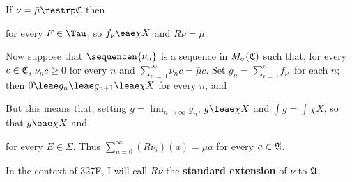 { If $\nu=\bar\mu\restrp\frak C$ then


\noindent for every $F\in\Tau$, so $f_{\nu}\eae\chi X$ and
$R\nu=\bar\mu$.

\medskip

 Now suppose that $\sequencen{\nu_n}$ is a sequence in
$M_{\sigma}(\frak C)$ such that, for every $c\in\frak C$, $\nu_nc\ge 0$
for every $n$ and $\sum_{n=0}^{\infty}\nu_nc=\bar\mu c$.  Set
$g_n=\sum_{i=0}^nf_{\nu_i}$ for each $n$;  then
$0\leae g_n\leae g_{n+1}\leae\chi X$ for every $n$, and


\noindent But this means that, setting $g=\lim_{n\to\infty}g_n$,
$g\leae\chi X$ and $\int g=\int\chi X$, so that $g\eae\chi X$ and


\noindent for every $E\in\Sigma$.   Thus
$\sum_{n=0}^{\infty}(R\nu_i)(a)=\bar\mu a$ for every $a\in\frak A$.
}%

 In the context of 327F, I will call $R\nu$
the {\bf standard extension} of $\nu$ to $\frak A$.



